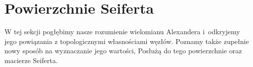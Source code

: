 \section{Powierzchnie Seiferta}
W tej sekcji pogłębimy nasze rozumienie wielomianu Alexandera i~odkryjemy jego powiązania z topologicznymi własnościami węzłów.
Poznamy także zupełnie nowy sposób na wyznaczanie jego wartości,
Posłużą do tego powierzchnie oraz macierze Seiferta.











